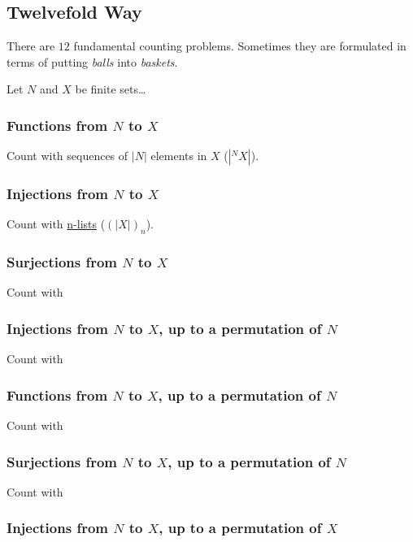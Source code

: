 \subsection{Twelvefold Way}\label{twelvefoldway}

There are $12$ fundamental counting problems. Sometimes they are formulated in terms of putting \emph{balls} into \emph{baskets}.\newline

Let $N$ and $X$ be finite sets\dots

\subsubsection{Functions from $N$ to $X$}

Count with sequences of $|N|$ elements in $X$ ($|^NX|$).

\subsubsection{Injections from $N$ to $X$}

Count with \hyperref[k-list]{n-lists} ($(|X|)_n$).

\subsubsection{Surjections from $N$ to $X$}

Count with 

\subsubsection{Injections from $N$ to $X$, up to a permutation of $N$}

Count with 

\subsubsection{Functions from $N$ to $X$, up to a permutation of $N$}

Count with 

\subsubsection{Surjections from $N$ to $X$, up to a permutation of $N$}

Count with 

\subsubsection{Injections from $N$ to $X$, up to a permutation of $X$}

